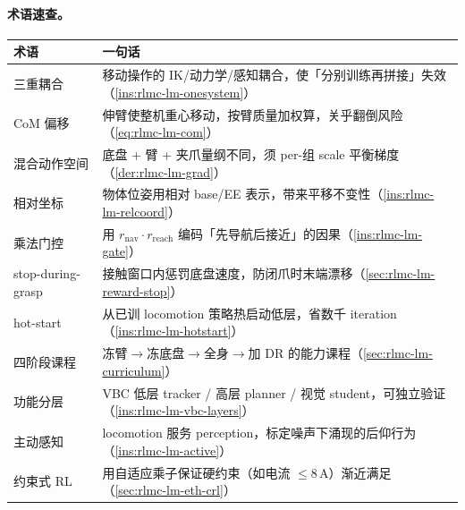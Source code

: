 \paragraph{术语速查。}
\begin{center}
\small
\begin{tabular}{@{}ll@{}}
\toprule
术语 & 一句话 \\
\midrule
三重耦合 & 移动操作的 IK/动力学/感知耦合，使「分别训练再拼接」失效（\cref{ins:rlmc-lm-onesystem}） \\
CoM 偏移 & 伸臂使整机重心移动，按臂质量加权算，关乎翻倒风险（\cref{eq:rlmc-lm-com}） \\
混合动作空间 & 底盘 + 臂 + 夹爪量纲不同，须 per-组 scale 平衡梯度（\cref{der:rlmc-lm-grad}） \\
相对坐标 & 物体位姿用相对 base/EE 表示，带来平移不变性（\cref{ins:rlmc-lm-relcoord}） \\
乘法门控 & 用 $r_{\text{nav}}\!\cdot\!r_{\text{reach}}$ 编码「先导航后接近」的因果（\cref{ins:rlmc-lm-gate}） \\
stop-during-grasp & 接触窗口内惩罚底盘速度，防闭爪时末端漂移（\cref{sec:rlmc-lm-reward-stop}） \\
hot-start & 从已训 locomotion 策略热启动低层，省数千 iteration（\cref{ins:rlmc-lm-hotstart}） \\
四阶段课程 & 冻臂$\to$冻底盘$\to$全身$\to$加 DR 的能力课程（\cref{sec:rlmc-lm-curriculum}） \\
功能分层 & VBC 低层 tracker / 高层 planner / 视觉 student，可独立验证（\cref{ins:rlmc-lm-vbc-layers}） \\
主动感知 & locomotion 服务 perception，标定噪声下涌现的后仰行为（\cref{ins:rlmc-lm-active}） \\
约束式 RL & 用自适应乘子保证硬约束（如电流 $\le 8\,$A）渐近满足（\cref{sec:rlmc-lm-eth-crl}） \\
\bottomrule
\end{tabular}
\end{center}

